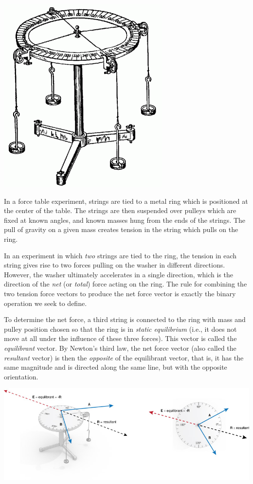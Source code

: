 \documentclass[12pt,letterpaper,reqno]{article}
\numberwithin{equation}{section}
\begin{document}
\begin{center}
	\includegraphics[scale=0.5]{figures_mvc/force_table_experiment_2}
\end{center}

In a force table experiment, strings are tied to a metal ring which is positioned at the center of the table. The strings are then suspended over pulleys which are fixed at known angles, and known masses hung from the ends of the strings. The pull of gravity on a given mass creates tension in the string which pulls on the ring. 

In an experiment in which \emph{two} strings are tied to the ring, the tension in each string gives rise to two forces pulling on the washer in different directions. However, the washer ultimately accelerates in a single direction, which is the direction of the \emph{net} (or \emph{total}) force acting on the ring. The rule for combining the two tension force vectors to produce the net force vector is exactly the binary operation we seek to define. 

To determine the net force, a third string is connected to the ring with mass and pulley position chosen so that the ring is in \emph{static equilibrium} (i.e., it does not move at all under the influence of these three forces). This vector is called the \emph{equilibrant} vector. By Newton's third law, the net force vector (also called the \emph{resultant} vector) is then the \emph{opposite} of the equilibrant vector, that is, it has the same magnitude and is directed along the same line, but with the opposite orientation.

\begin{center}
	\includegraphics[scale=0.5]{figures_mvc/force-table-equi-res}
\end{center}
\end{document}
